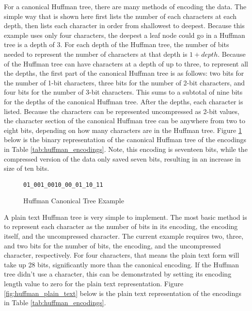 \documentclass[doublespace,nopageskip]{VTthesis}
\begin{document}
For a canonical Huffman tree, there are many methods of encoding the data. The simple way that is shown here first lists the number of each characters at each depth, then lists each character in order from shallowest to deepest. Because this example uses only four characters, the deepest a leaf node could go in a Huffman tree is a depth of 3. For each depth of the Huffman tree, the number of bits needed to represent the number of characters at that depth is $1+depth$. Because of the Huffman tree can have characters at a depth of up to three, to represent all the depths, the first part of the canonical Huffman tree is as follows: two bits for the number of 1-bit characters, three bits for the number of 2-bit characters, and four bits for the number of 3-bit characters. This sums to a subtotal of nine bits for the depths of the canonical Huffman tree. After the depths, each character is listed. Because the characters can be represented uncompressed as 2-bit values, the character section of the canonical Huffman tree can be anywhere from two to eight bits, depending  on how many characters are in the Huffman tree. Figure \ref{fig:huffman_canonical} below is the binary representation of the canonical Huffman tree of the encodings in Table \ref{tab:huffman_encodings}. Note, this encoding is seventeen bits, while the compressed version of the data only saved seven bits, resulting in an increase in size of ten bits.

\begin{figure}[htb]
	\centering
    \begin{lstlisting}
01_001_0010_00_01_10_11
    \end{lstlisting}
	\caption{Huffman Canonical Tree Example}
	\label{fig:huffman_canonical}
\end{figure}

A plain text Huffman tree is very simple to implement. The most basic method is to represent each character as the number of bits in its encoding, the encoding itself, and the uncompressed character. The current example requires two, three, and two bits for the number of bits, the encoding, and the uncompressed character, respectively. For four characters, that means the plain text form will take up 28 bits, significantly more than the canonical encoding. If the Huffman tree didn't use a character, this can be demonstrated by setting its encoding length value to zero for the plain text representation. Figure \ref{fig:huffman_plain_text} below is the plain text representation of the encodings in Table \ref{tab:huffman_encodings}.
\end{document}
